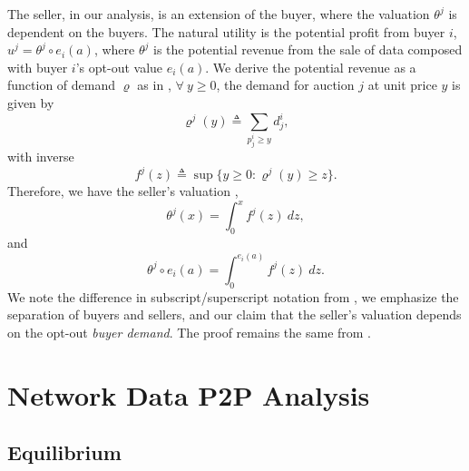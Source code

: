 \documentclass[12pt]{article}
\theoremstyle{definition}
\begin{document}
\begin{multicols}{2}
The seller, in our analysis, is an extension of the buyer, where the valuation
$\theta^j$ is dependent on the buyers. The natural utility is the potential
profit from buyer $i$, $u^j = \theta^j\circ e_i(a)$, where $\theta^j$ is the
potential revenue from the sale of data composed with buyer $i$'s opt-out value
$e_i(a)$. We derive the potential revenue as a function of demand $\varrho$ as in
\cite{semret}, $\forall \ y\ge 0$, the demand for auction $j$ at unit price $y$ is given by
$$
    \varrho^j(y) \triangleq \displaystyle\sum_{p_j^i\ge y} d_j^i,
$$
with inverse
$$
    f^j(z) \triangleq \sup\big\lbrace y\ge 0: \varrho^j(y) \ge z\big\rbrace.
$$
Therefore, we have the seller's valuation \cite{semret},
$$
    \theta^j(x) = \displaystyle\int_0^x f^j(z) \ dz,
$$
and 
$$
    \theta^j\circ e_i(a) = \displaystyle\int_0^{e_i(a)} f^j(z) \ dz.
$$
We note the difference in subscript/superscript notation from \cite{semret},
 we emphasize the separation of buyers and sellers, and our
claim that the seller's valuation depends on the opt-out \emph{buyer demand}.
The proof remains the same from \cite{semret}.

\section{Network Data P2P Analysis}

\subsection{Equilibrium}


\end{multicols}
\end{document}
